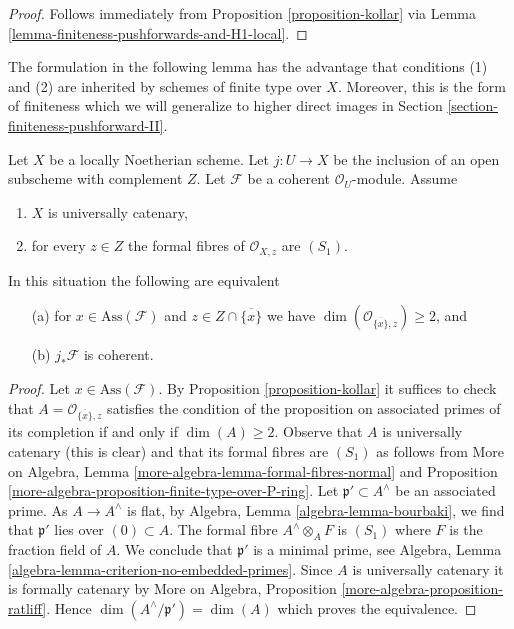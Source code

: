 \begin{proof}
Follows immediately from Proposition \ref{proposition-kollar}
via Lemma \ref{lemma-finiteness-pushforwards-and-H1-local}.
\end{proof}

\noindent
The formulation in the following lemma has the advantage that conditions
(1) and (2) are inherited by schemes of finite type over $X$.
Moreover, this is the form of finiteness which we will generalize
to higher direct images in Section \ref{section-finiteness-pushforward-II}.

\begin{lemma}
\label{lemma-finiteness-pushforward-general}
Let $X$ be a locally Noetherian scheme.
Let $j : U \to X$ be the inclusion of an
open subscheme with complement $Z$. Let $\mathcal{F}$ be a coherent
$\mathcal{O}_U$-module. Assume
\begin{enumerate}
\item $X$ is universally catenary,
\item for every $z \in Z$ the formal fibres of $\mathcal{O}_{X, z}$
are $(S_1)$.
\end{enumerate}
In this situation the following are equivalent
\begin{enumerate}
\item[(a)] for $x \in \text{Ass}(\mathcal{F})$ and
$z \in Z \cap \overline{\{x\}}$ we have
$\dim(\mathcal{O}_{\overline{\{x\}}, z}) \geq 2$, and
\item[(b)] $j_*\mathcal{F}$ is coherent.
\end{enumerate}
\end{lemma}

\begin{proof}
Let $x \in \text{Ass}(\mathcal{F})$. By Proposition \ref{proposition-kollar}
it suffices to check that $A = \mathcal{O}_{\overline{\{x\}}, z}$ satisfies
the condition of the proposition on associated primes of its completion
if and only if $\dim(A) \geq 2$.
Observe that $A$ is universally catenary (this is clear)
and that its formal fibres are $(S_1)$ as follows from
More on Algebra, Lemma \ref{more-algebra-lemma-formal-fibres-normal} and
Proposition \ref{more-algebra-proposition-finite-type-over-P-ring}.
Let $\mathfrak p' \subset A^\wedge$ be an associated prime.
As $A \to A^\wedge$ is flat,
by Algebra, Lemma \ref{algebra-lemma-bourbaki},
we find that $\mathfrak p'$ lies over $(0) \subset A$.
The formal fibre $A^\wedge \otimes_A F$ is $(S_1)$ where $F$ is
the fraction field of $A$. We conclude that $\mathfrak p'$ is a
minimal prime, see
Algebra, Lemma \ref{algebra-lemma-criterion-no-embedded-primes}.
Since $A$ is universally catenary it is formally catenary
by More on Algebra, Proposition \ref{more-algebra-proposition-ratliff}.
Hence $\dim(A^\wedge/\mathfrak p') = \dim(A)$ which
proves the equivalence.
\end{proof}






